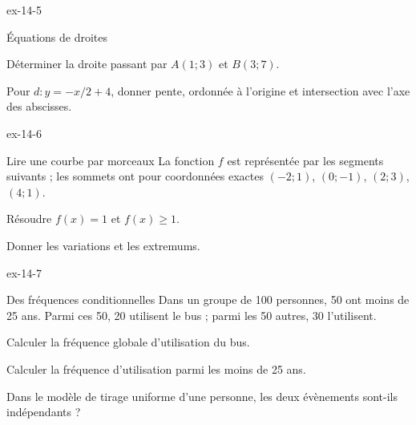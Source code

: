 \begin{blocLivre}{ex-14-5}
\begin{exercice}[1]{Équations de droites}
\begin{questions}
\item Déterminer la droite passant par $A(1;3)$ et $B(3;7)$.
\item Pour $d:y=-x/2+4$, donner pente, ordonnée à l’origine et intersection avec l’axe des abscisses.
\end{questions}
\end{exercice}
\end{blocLivre}
\clearpage
{}
\begin{blocLivre}{ex-14-6}
\begin{exercice}[2]{Lire une courbe par morceaux}
La fonction $f$ est représentée par les segments suivants ; les sommets ont pour coordonnées exactes $(-2;1)$, $(0;-1)$, $(2;3)$, $(4;1)$.\begin{center}
\end{center}
\begin{questions}
\item Résoudre $f(x)=1$ et $f(x)\geq1$.
\item Donner les variations et les extremums.
\end{questions}
\end{exercice}
\end{blocLivre}
\begin{blocLivre}{ex-14-7}
\begin{exercice}[2]{Des fréquences conditionnelles}
Dans un groupe de 100 personnes, 50 ont moins de 25 ans. Parmi ces 50, 20 utilisent le bus ; parmi les 50 autres, 30 l’utilisent.\begin{questions}
\item Calculer la fréquence globale d’utilisation du bus.
\item Calculer la fréquence d’utilisation parmi les moins de 25 ans.
\item Dans le modèle de tirage uniforme d’une personne, les deux évènements sont-ils indépendants ?
\end{questions}
\end{exercice}
\end{blocLivre}
